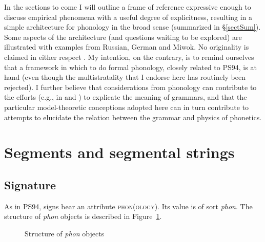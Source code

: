 \documentclass[output=paper]{langsci/langscibook}
\begin{document}
In the sections to come I will outline a frame of reference
expressive enough to discuss empirical phenomena with a useful degree of
explicitness, resulting in a simple architecture for phonology in the broad
sense (summarized in \S\ref{sectSum}). Some aspects of the architecture
(and questions waiting to be explored) are illustrated with examples from
Russian, German and Miwok. No originality is claimed in either respect%
. My intention, on the contrary, is to remind ourselves that a framework in
which to do formal phonology, closely related to {\small PS94}, is at hand
(even though the multistratality that I endorse here has routinely been
rejected). I further believe that considerations from phonology can
contribute to the efforts (e.g., in \citealt{king:99} and
\citealt{poll:98}) to explicate the meaning of grammars,
and that the particular model-theoretic conceptions adopted here can in
turn contribute to attempts to elucidate the relation between the grammar
and physics of phonetics.


\section{Segments and segmental strings}
\label{sectSS}


\subsection{Signature}
\label{sec:1.2.1}


As in {\small PS94}, signs bear an attribute \textsc{phon(olo\-gy)}. Its value is of sort
\textit{phon}. The structure of \textit{phon} objects is described
in Figure~\ref{F1}.
\begin{figure}[ht]
\begin{avm}
\end{avm}
\caption{\label{F1} Structure of \textit{phon} objects}
\end{figure}
\end{document}
